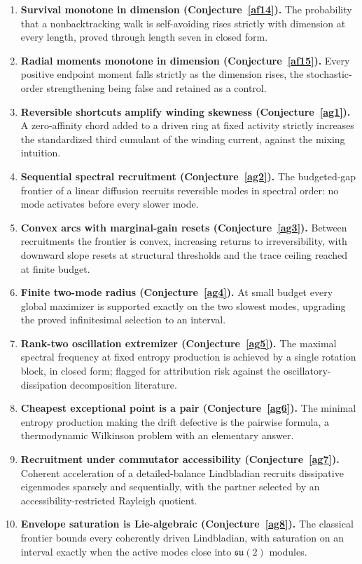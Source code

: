 \documentclass[11pt]{article}
\theoremstyle{definition}
\begin{document}
\begin{enumerate}
\item \textbf{Survival monotone in dimension (Conjecture~\ref{af14}).}  The probability that a nonbacktracking walk is self-avoiding rises strictly with dimension at every length, proved through length seven in closed form.
\item \textbf{Radial moments monotone in dimension (Conjecture~\ref{af15}).}  Every positive endpoint moment falls strictly as the dimension rises, the stochastic-order strengthening being false and retained as a control.
\item \textbf{Reversible shortcuts amplify winding skewness (Conjecture~\ref{ag1}).}  A zero-affinity chord added to a driven ring at fixed activity strictly increases the standardized third cumulant of the winding current, against the mixing intuition.
\item \textbf{Sequential spectral recruitment (Conjecture~\ref{ag2}).}  The budgeted-gap frontier of a linear diffusion recruits reversible modes in spectral order: no mode activates before every slower mode.
\item \textbf{Convex arcs with marginal-gain resets (Conjecture~\ref{ag3}).}  Between recruitments the frontier is convex, increasing returns to irreversibility, with downward slope resets at structural thresholds and the trace ceiling reached at finite budget.
\item \textbf{Finite two-mode radius (Conjecture~\ref{ag4}).}  At small budget every global maximizer is supported exactly on the two slowest modes, upgrading the proved infinitesimal selection to an interval.
\item \textbf{Rank-two oscillation extremizer (Conjecture~\ref{ag5}).}  The maximal spectral frequency at fixed entropy production is achieved by a single rotation block, in closed form; flagged for attribution risk against the oscillatory-dissipation decomposition literature.
\item \textbf{Cheapest exceptional point is a pair (Conjecture~\ref{ag6}).}  The minimal entropy production making the drift defective is the pairwise formula, a thermodynamic Wilkinson problem with an elementary answer.
\item \textbf{Recruitment under commutator accessibility (Conjecture~\ref{ag7}).}  Coherent acceleration of a detailed-balance Lindbladian recruits dissipative eigenmodes sparsely and sequentially, with the partner selected by an accessibility-restricted Rayleigh quotient.
\item \textbf{Envelope saturation is Lie-algebraic (Conjecture~\ref{ag8}).}  The classical frontier bounds every coherently driven Lindbladian, with saturation on an interval exactly when the active modes close into $\mathfrak{su}(2)$ modules.

\end{enumerate}
\end{document}

